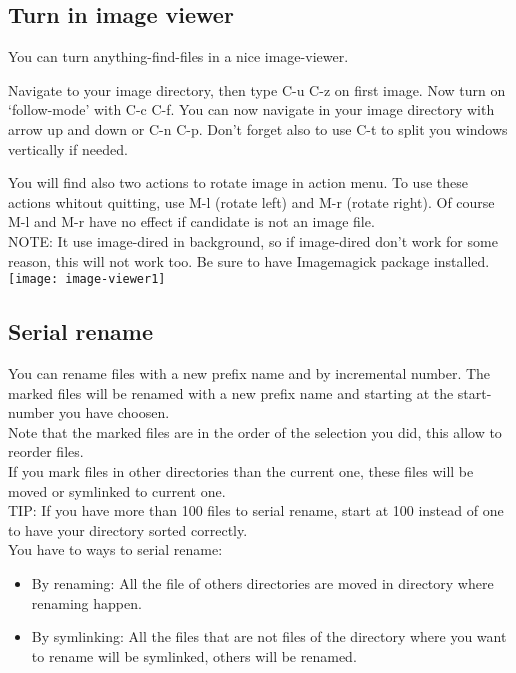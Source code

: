 \documentclass[a4paper,11pt]{article}
\begin{document}
\subsection{Turn in image viewer}
\label{sec:turn-image-viewer}
You can turn anything-find-files in a nice image-viewer.

Navigate to your image directory, then type C-u C-z on first image.
Now turn on `follow-mode' with C-c C-f.
You can now navigate in your image directory with arrow up and down or C-n C-p.
Don't forget also to use C-t to split you windows vertically if needed.

You will find also two actions to rotate image in action menu. 
To use these actions whitout quitting, use M-l (rotate left) and M-r (rotate right).
Of course M-l and M-r have no effect if candidate is not an image file.\\

NOTE:
It use image-dired in background, so if image-dired don't work for some reason, this will
not work too.
Be sure to have Imagemagick package installed.\\

\texttt{[image: image-viewer1]}
\newpage

\subsection{Serial rename}
\label{sec:serial-rename}
You can rename files with a new prefix name and by incremental number.
The marked files will be renamed with a new prefix name and starting
at the start-number you have choosen.\\
Note that the marked files are in the order of the selection you did, this allow to reorder
files.\\
If you mark files in other directories than the current one, these files will be moved or symlinked to current one.\\

TIP: If you have more than 100 files to serial rename, start at 100 instead of one to have your directory
sorted correctly.\\

You have to ways to serial rename:\\
\begin{itemize}
\item By renaming: All the file of others directories are moved in directory where renaming happen.\\ 
\end{itemize}
\begin{itemize}
\item By symlinking: All the files that are not files of the directory where you want to rename will be symlinked,
others will be renamed.\\
\end{itemize}
\end{document}
